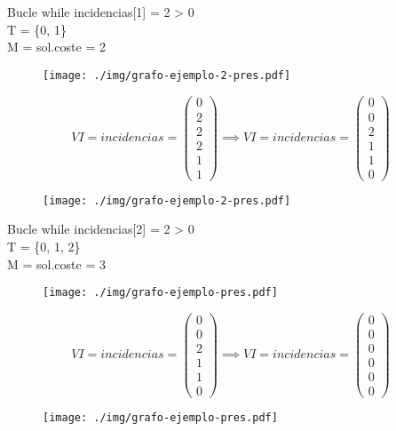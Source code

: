 \documentclass[spanish]{beamer}
\begin{document}
\begin{frame}{Bucle while}
	incidencias[1] = 2 > 0\\
	T = \{0, 1\}\\
	M = sol.coste = 2
	\begin{figure}[H]
		\centering \texttt{[image: ./img/grafo-ejemplo-2-pres.pdf]}
	\end{figure}
\end{frame}

\begin{frame}{}
	$$  VI = incidencias =
	\begin{pmatrix}
	  0 \\
	  2 \\
	  2 \\
	  2 \\
	  1 \\
	  1
	\end{pmatrix} \implies  VI = incidencias =
	\begin{pmatrix}
	  0 \\
	  0 \\
	  2 \\
	  1 \\
	  1 \\
	  0
	\end{pmatrix}$$
	\begin{figure}[H]
		\centering \texttt{[image: ./img/grafo-ejemplo-2-pres.pdf]}
	\end{figure}
\end{frame}

\begin{frame}{Bucle while}
	incidencias[2] = 2 > 0\\
	T = \{0, 1, 2\}\\
	M = sol.coste = 3
	\begin{figure}[H]
		\centering \texttt{[image: ./img/grafo-ejemplo-pres.pdf]}
	\end{figure}
\end{frame}

\begin{frame}{}
	$$  VI = incidencias =
	\begin{pmatrix}
	  0 \\
	  0 \\
	  2 \\
	  1 \\
	  1 \\
	  0
	\end{pmatrix} \implies  VI = incidencias =
	\begin{pmatrix}
	  0 \\
	  0 \\
	  0 \\
	  0 \\
	  0 \\
	  0
	\end{pmatrix}$$
	\begin{figure}[H]
		\centering \texttt{[image: ./img/grafo-ejemplo-pres.pdf]}
	\end{figure}
\end{frame}
\end{document}

